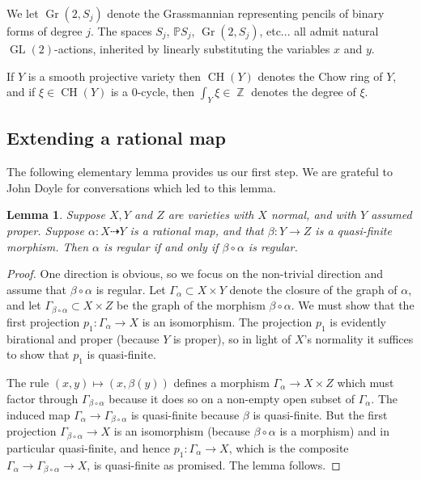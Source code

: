 \documentclass[reqno, 11pt]{amsart}
\theoremstyle{plain}
\newtheorem{lemma}[theorem]{Lemma}
\theoremstyle{remark}
\renewcommand{\P}{\mathbb{P}}
\DeclareMathOperator{\Z}{\mathbb{Z}}
\DeclareMathOperator{\Gr}{Gr}
\DeclareMathOperator{\CH}{CH}
\DeclareMathOperator{\GL}{GL}
\begin{document}
    
    We let $\Gr(2,S_j)$ denote the Grassmannian representing pencils of binary forms of degree $j$. The spaces $S_{j}$, $\P S_{j}$, $\Gr(2,S_{j})$, etc... all admit natural $\GL(2)$-actions, inherited by linearly substituting the variables $x$ and $y$.

    If $Y$ is a smooth projective variety then $\CH(Y)$ denotes the Chow ring of $Y$, and if $\xi \in \CH(Y)$ is a $0$-cycle, then $\int_{Y} \xi \in \Z$ denotes the degree of $\xi$.
    
    \subsection{Extending a rational map}
    
    The following elementary lemma provides us our first step.  We are grateful to John Doyle for conversations which led to this lemma.
    \begin{lemma}
        \label{lemma:extension}
        Suppose $X, Y$ and $Z$ are varieties with $X$ normal, and with $Y$ assumed proper. Suppose $\alpha : X \dashrightarrow Y$ is a rational map, and that $\beta : Y \to Z$ is a quasi-finite morphism.  Then $\alpha$ is regular if and only if $\beta \circ \alpha$ is regular.
    \end{lemma}
    
    \begin{proof}
        One direction is obvious, so we focus on the non-trivial direction and assume that $\beta \circ \alpha$ is regular. Let $\Gamma_{\alpha} \subset X \times Y$ denote the closure of the graph of $\alpha$, and let $\Gamma_{\beta \circ \alpha} \subset X \times Z$ be the graph of the morphism $\beta \circ \alpha$.  We must show that the first projection $p_1 : \Gamma_{\alpha} \to X$ is an isomorphism.  The projection $p_1$ is evidently birational and proper (because $Y$ is proper), so in light of $X$'s normality it suffices to show that $p_1$ is quasi-finite. 
        
        The rule $(x,y) \mapsto (x,\beta(y))$ defines a morphism $\Gamma_{\alpha} \to X \times Z$ which must factor through $\Gamma_{\beta \circ \alpha}$ because it does so on a non-empty open subset of $\Gamma_{\alpha}$.  The induced map $\Gamma_{\alpha} \to \Gamma_{\beta \circ \alpha}$ is quasi-finite because $\beta$ is quasi-finite.   But the  first projection $\Gamma_{\beta \circ \alpha} \to X$ is an isomorphism (because $\beta \circ \alpha$ is a morphism) and in particular quasi-finite, and hence $p_1 : \Gamma_{\alpha} \to X$, which is the composite $\Gamma_{\alpha} \to \Gamma_{\beta \circ \alpha} \to X$, is quasi-finite as promised. The lemma follows.
    \end{proof}
    
\end{document}
